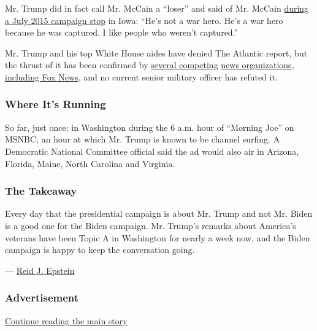 Mr. Trump did in fact call Mr. McCain a ``loser'' and said of Mr. McCain
\href{https://www.nytimes3xbfgragh.onion/2015/07/19/us/politics/trump-belittles-mccains-war-record.html}{during
a July 2015 campaign stop} in Iowa: ``He's not a war hero. He's a war
hero because he was captured. I like people who weren't captured.''

Mr. Trump and his top White House aides have denied The Atlantic report,
but the thrust of it has been confirmed by
\href{https://apnews.com/b823f2c285641a4a09a96a0b195636ed}{several
competing}
\href{https://www.washingtonpost.com/politics/trump-said-us-soldiers-injured-and-killed-in-war-were-losers-magazine-reports/2020/09/03/6e1725cc-ee35-11ea-99a1-71343d03bc29_story.html}{news
organizations},
\href{https://video.foxnews.com/v/6187968200001\#sp=show-clips}{including
Fox News}, and no current senior military officer has refuted it.

\hypertarget{where-its-running}{%
\subsubsection{Where It's Running}\label{where-its-running}}

So far, just once: in Washington during the 6 a.m. hour of ``Morning
Joe'' on MSNBC, an hour at which Mr. Trump is known to be channel
surfing. A Democratic National Committee official said the ad would also
air in Arizona, Florida, Maine, North Carolina and Virginia.

\hypertarget{the-takeaway}{%
\subsubsection{The Takeaway}\label{the-takeaway}}

Every day that the presidential campaign is about Mr. Trump and not Mr.
Biden is a good one for the Biden campaign. Mr. Trump's remarks about
America's veterans have been Topic A in Washington for nearly a week
now, and the Biden campaign is happy to keep the conversation going.

--- \href{https://www.nytimes3xbfgragh.onion/by/reid-j-epstein}{Reid J.
Epstein}

\hypertarget{advertisement-3}{%
\subsubsection{Advertisement}\label{advertisement-3}}

\protect\hyperlink{after-dfp-ad-mid4}{Continue reading the main story}

